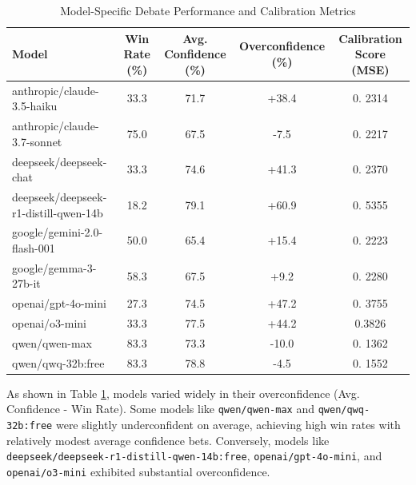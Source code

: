 \documentclass{article}
\begin{document}
\begin{table}[h]
  \caption{Model-Specific Debate Performance and Calibration Metrics}
  \label{tab:model_calibration}
  \centering
  \begin{tabular}{lcccc}
    \toprule
    Model                                   & Win Rate (\%) & Avg. Confidence (\%) & Overconfidence (\%) & Calibration Score (MSE) \\
    \midrule
    anthropic/claude-3.5-haiku              & 33.3          & 71.7                 & +38.4               & 0.
    2314 \\
    anthropic/claude-3.7-sonnet             & 75.0          & 67.5                 & -7.5                & 0.
    2217 \\
    deepseek/deepseek-chat                  & 33.3          & 74.6                 & +41.3               & 0.
    2370 \\
    deepseek/deepseek-r1-distill-qwen-14b   & 18.2          & 79.1                 & +60.9               & 0.
    5355 \\
    google/gemini-2.0-flash-001             & 50.0          & 65.4                 & +15.4               & 0.
    2223 \\
    google/gemma-3-27b-it                   & 58.3          & 67.5                 & +9.2                & 0.
    2280 \\
    openai/gpt-4o-mini                      & 27.3          & 74.5                 & +47.2               & 0.
    3755 \\
    openai/o3-mini                     & 33.3          & 77.5                 & +44.2               & 0.3826 \\
    qwen/qwen-max                           & 83.3          & 73.3                 & -10.0               & 0.
    1362 \\
    qwen/qwq-32b:free                       & 83.3          & 78.8                 & -4.5                & 0.
    1552 \\
    \bottomrule
  \end{tabular}
\end{table}

As shown in Table \ref{tab:model_calibration}, models varied widely in their overconfidence (Avg. Confidence -
Win Rate). Some models like \texttt{qwen/qwen-max} and \texttt{qwen/qwq-32b:free} were slightly underconfident
on average, achieving high win rates with relatively modest average confidence bets. Conversely, models like
\texttt{deepseek/deepseek-r1-distill-qwen-14b:free}, \texttt{openai/gpt-4o-mini}, and \texttt{openai/o3-mini}
exhibited substantial overconfidence.
\end{document}
